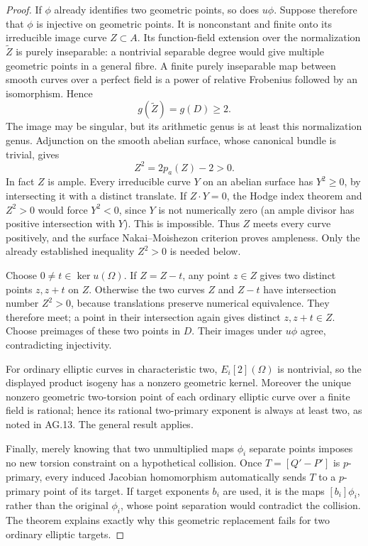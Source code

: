 \begin{proof}
If $\phi$ already identifies two geometric points, so does
$u\phi$. Suppose therefore that $\phi$ is injective on
geometric points. It is nonconstant and finite onto its
irreducible image curve $Z\subset A$. Its function-field
extension over the normalization $\widetilde Z$ is purely
inseparable: a nontrivial separable degree would give
multiple geometric points in a general fibre. A finite
purely inseparable map between smooth curves over a perfect
field is a power of relative Frobenius followed by an
isomorphism. Hence
\[
                g(\widetilde Z)=g(D)\ge2.
\]
The image may be singular, but its arithmetic genus is
at least this normalization genus. Adjunction on the smooth
abelian surface, whose canonical bundle is trivial, gives
\[
                   Z^2=2p_a(Z)-2>0.
\]
In fact $Z$ is ample. Every irreducible curve $Y$ on an
abelian surface has $Y^2\ge0$, by intersecting it with a
distinct translate. If $Z\cdot Y=0$, the Hodge index
theorem and $Z^2>0$ would force $Y^2<0$, since $Y$
is not numerically zero (an ample divisor has positive
intersection with $Y$). This is impossible. Thus $Z$
meets every curve positively, and the surface
Nakai--Moishezon criterion proves ampleness. Only the
already established inequality $Z^2>0$ is needed below.

Choose $0\ne t\in\ker u(\Omega)$. If $Z=Z-t$,
any point $z\in Z$ gives two distinct points $z,z+t$
on $Z$. Otherwise the two curves $Z$ and $Z-t$ have
intersection number $Z^2>0$, because translations preserve
numerical equivalence. They therefore meet; a point in
their intersection again gives distinct $z,z+t\in Z$.
Choose preimages of these two points in $D$. Their images
under $u\phi$ agree, contradicting injectivity.

For ordinary elliptic curves in characteristic two,
$E_i[2](\Omega)$ is nontrivial, so the displayed product
isogeny has a nonzero geometric kernel. Moreover the unique
nonzero geometric two-torsion point of each ordinary
elliptic curve over a finite field is rational; hence its
rational two-primary exponent is always at least two,
as noted in AG.13. The general result applies.

Finally, merely knowing that two unmultiplied maps
$\phi_i$ separate points imposes no new torsion constraint
on a hypothetical collision. Once
$T=[Q'-P']$ is $p$-primary, every induced Jacobian
homomorphism automatically sends $T$ to a $p$-primary
point of its target. If target exponents $b_i$ are used,
it is the maps $[b_i]\phi_i$, rather than the original
$\phi_i$, whose point separation would contradict the
collision. The theorem explains exactly why this geometric
replacement fails for two ordinary elliptic targets.
\end{proof}


